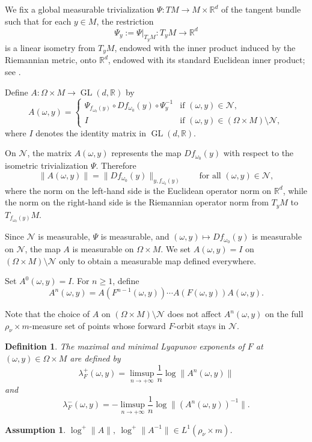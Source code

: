 \documentclass[a4paper,12pt,reqno]{amsart}
\numberwithin{equation}{section}
\newtheorem{assumption}{Assumption}
\newtheorem{defn}[theorem]{Definition}
\newcommand{\cal}{\mathcal}
\newcommand{\NN}{{\cal N}}
\newcommand{\Rr}{{\mathbb{R}}}
\begin{document}
We fix a global measurable trivialization $\Psi\colon TM\to M\times\Rr^d$ of the tangent bundle such that for each $y\in M$, the restriction
\[
\Psi_y:=\Psi|_{T_yM}\colon T_yM\to\Rr^d
\]
is a linear isometry from $T_yM$, endowed with the inner product induced by the Riemannian metric, onto $\Rr^d$, endowed with its standard Euclidean inner product; see \cite[Lemma~4.2.4]{Arnold:98}.

Define $A\colon \Omega\times M\to \operatorname{GL}(d,\Rr)$ by
\[
A(\omega,y)
=
\begin{cases}
\Psi_{f_{\omega_0}(y)}\circ Df_{\omega_0}(y)\circ \Psi_y^{-1}
& \text{if } (\omega,y)\in \NN,\\[2mm]
I
& \text{if } (\omega,y)\in (\Omega\times M)\setminus \NN,
\end{cases}
\]
where $I$ denotes the identity matrix in $\operatorname{GL}(d,\Rr)$.

On $\NN$, the matrix $A(\omega,y)$ represents the map $Df_{\omega_0}(y)$ with respect to the isometric trivialization $\Psi$. Therefore
\[
\|A(\omega,y)\|
=
\|Df_{\omega_0}(y)\|_{y,f_{\omega_0}(y)}
\qquad\text{for all }(\omega,y)\in\NN,
\]
where the norm on the left-hand side is the Euclidean operator norm on $\Rr^d$, while the norm on the right-hand side is the Riemannian operator norm from $T_yM$ to $T_{f_{\omega_0}(y)}M$.

Since $\NN$ is measurable, $\Psi$ is measurable, and
$(\omega,y)\mapsto Df_{\omega_0}(y)$ is measurable on $\NN$, the map $A$ is measurable on $\Omega\times M$. We set $A(\omega,y)=I$ on
$(\Omega\times M)\setminus\NN$ only to obtain a measurable map defined everywhere.

Set $A^0(\omega,y)=I$. For $n\ge 1$, define
\[
A^n(\omega,y)
=
A(F^{n-1}(\omega,y))\cdots A(F(\omega,y))A(\omega,y).
\]

Note that the choice of $A$ on $(\Omega\times M)\setminus\NN$ does not affect
$A^n(\omega,y)$ on the full $\rho_\nu\times m$-measure set of points whose forward $F$-orbit stays in $\NN$.

\begin{defn}
The maximal and minimal Lyapunov exponents of $F$ at $(\omega,y) \in \Omega \times M$ are defined by
\[
\lambda_F^+(\omega,y) = \limsup_{n\to+\infty} \frac1n\log\|A^n(\omega,y)\|
\]
and
\[
\lambda_F^-(\omega,y)
= -\limsup_{n\to+\infty}
\frac1n\log\|(A^n(\omega,y))^{-1}\|.
\]
\end{defn}

\begin{assumption}\label{as:three}
$\log^+\|A\|,\ \log^+\|A^{-1}\|
    \in L^1(\rho_\nu\times m)$.
\end{assumption}
\end{document}
